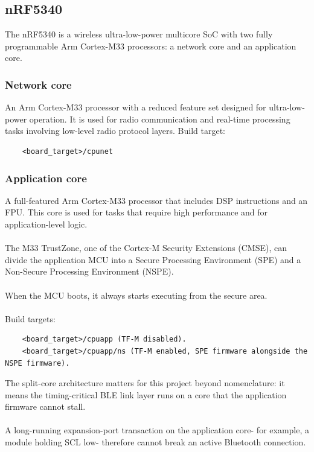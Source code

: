 \documentclass[12pt, a4paper]{article}
\begin{document}
\subsection{nRF5340}
\label{comp:nrf5340}
The nRF5340 is a wireless ultra-low-power multicore SoC with two fully
programmable Arm Cortex-M33 processors: a network core and an application core.

\subsubsection{Network core}
An Arm Cortex-M33 processor with a reduced feature set designed for
ultra-low-power operation. It is used for radio communication and real-time
processing tasks involving low-level radio protocol layers. Build target:
\begin{verbatim}
    <board_target>/cpunet
\end{verbatim}

\subsubsection{Application core}
A full-featured Arm Cortex-M33 processor that includes DSP instructions and an
FPU. This core is used for tasks that require high performance and for
application-level logic.\\\\
The M33 TrustZone, one of the Cortex-M Security
Extensions (CMSE), can divide the application MCU into a Secure Processing
Environment (SPE) and a Non-Secure Processing Environment (NSPE).\\\\
When the MCU
boots, it always starts executing from the secure area.\\\\
Build targets:
\begin{verbatim}
    <board_target>/cpuapp (TF-M disabled).
    <board_target>/cpuapp/ns (TF-M enabled, SPE firmware alongside the NSPE firmware).
\end{verbatim}
The split-core architecture matters for this project beyond nomenclature: it
means the timing-critical BLE link layer runs on a core that the application
firmware cannot stall.\\\\
A long-running expansion-port transaction on the
application core- for example, a module holding SCL low- therefore cannot
break an active Bluetooth connection.
\end{document}
